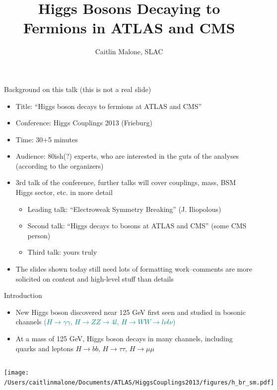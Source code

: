 \documentclass{beamer}
\title{Higgs Bosons Decaying to Fermions in ATLAS and CMS}
\author{Caitlin Malone, SLAC}
\institute{on behalf of the ATLAS Collaboration\\Higgs Couplings 2013, Freiburg\\14 October 2013 }
\date{}
\begin{document}
\frame{\titlepage}



\begin{frame}{Background on this talk (this is not a real slide)}
	\begin{itemize}
		\item Title: ``Higgs boson decays to fermions at ATLAS and CMS''
		\item Conference: Higgs Couplings 2013 (Frieburg)
		\item Time: 30+5 minutes
		\item Audience: 80ish(?) experts, who are interested in the guts of the analyses (according to the organizers)
		\item 3rd talk of the conference, further talks will cover couplings, mass, BSM Higgs sector, etc. in more detail
		\begin{itemize}
			\item Leading talk: ``Electroweak Symmetry Breaking'' (J. Iliopolous)
			\item Second talk: ``Higgs decays to bosons at ATLAS and CMS'' (some CMS person)
			\item Third talk: yours truly
		\end{itemize}
		\item The slides shown today still need lots of formatting work--comments are more solicited on content and high-level stuff than details
	\end{itemize}
\end{frame}



\begin{frame}{Introduction}
	\begin{itemize} \scriptsize
		\item New Higgs boson discovered near 125 GeV first seen and studied in bosonic channels \textcolor{Teal}{($H\rightarrow\gamma\gamma$, $H\rightarrow ZZ\rightarrow 4l$, $H\rightarrow WW \rightarrow l\nu l \nu$)}
		\item At a mass of 125 GeV, Higgs boson decays in many channels, including \textcolor{BrickRed}{quarks and leptons $H\rightarrow bb$, $H\rightarrow\tau\tau$, $H\rightarrow\mu\mu$}
	\end{itemize}
	\begin{columns}[c]
			\texttt{[image: /Users/caitlinmalone/Documents/ATLAS/HiggsCouplings2013/figures/h\_br\_sm.pdf]}
	\end{columns}

\end{frame}
\end{document}
